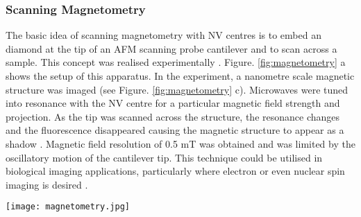 \documentclass[10pt]{article}
\newenvironment{Figure}
  {\par\medskip\noindent\minipage{\linewidth}}
  {\endminipage\par\medskip}
\begin{document}
\begin{multicols}{2}
\subsubsection{Scanning Magnetometry}
The basic idea of scanning magnetometry with NV centres is to embed an diamond at the tip of an AFM scanning probe cantilever and to scan across a sample. This concept was realised experimentally \cite{balasubramanian2008nanoscale}. Figure. \ref{fig:magnetometry} a shows the setup of this apparatus. In the experiment, a nanometre scale magnetic structure was imaged (see Figure. \ref{fig:magnetometry} c). Microwaves were tuned into resonance with the NV centre for a particular magnetic field strength and projection. As the tip was scanned across the structure, the resonance changes and the fluorescence disappeared causing the magnetic structure to appear as a shadow \cite{balasubramanian2008nanoscale}. Magnetic field resolution of 0.5 mT was obtained and was limited by the oscillatory motion of the cantilever tip. This technique could be utilised in biological imaging applications, particularly where electron or even nuclear spin imaging is desired \cite{balasubramanian2008nanoscale}. 

\begin{Figure}
  \texttt{[image: magnetometry.jpg]}
  \label{fig:magnetometry}
\end{Figure}




\end{multicols}
\end{document}
